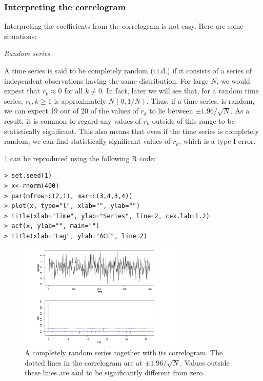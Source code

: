 \subsubsection{Interpreting the correlogram}
Interpreting the coefficients from the correlogram is not easy. Here are some situations:

\textit{Random series}

A time series is said to be completely random (i.i.d.) if it consists of a series of independent observations having the same distribution. For large $N$, we would expect that $r_k \approx 0$ for all $k \neq 0$. In fact, later we will see that, for a random time series, $r_k, k \geq 1$ is approximately $N(0, 1/N)$. Thus, if a time series, is random, we can expect 19 out of 20 of the values of $r_k$ to lie between $\pm 1.96/ \sqrt{N}$. As a result, it is common to regard any values of $r_k$ outside of this range to be statistically significant. This also means that even if the time series is completely random, we can find statistically significant values of $r_k$, which is a type I error.

\cref{fig:2.4} can be reproduced using the following R code:
\begin{verbatim}
> set.seed(1)
> x<-rnorm(400)
> par(mfrow=c(2,1), mar=c(3,4,3,4))
> plot(x, type="l", xlab="", ylab="")
> title(xlab="Time", ylab="Series", line=2, cex.lab=1.2)
> acf(x, ylab="", main="")
> title(xlab="Lag", ylab="ACF", line=2)
\end{verbatim}

\begin{figure}[ht]
	\centering
	\includegraphics[width=0.7\textwidth]{Chapter 2/fig2-4.png}
	\caption{A completely random series together with its correlogram. The dotted lines in the correlogram are at $\pm 1.96 / \sqrt{N}$. Values outside these lines are said to be significantly different from zero.}
	\label{fig:2.4}
\end{figure}

